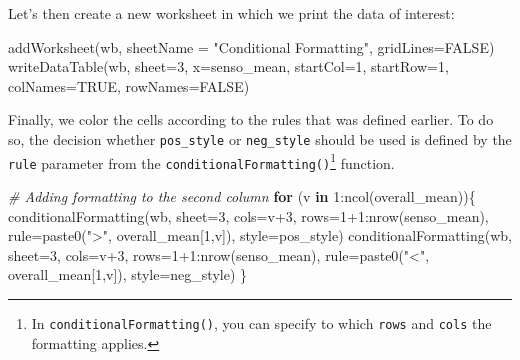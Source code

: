 \documentclass[
]{krantz}
\makeatletter
\newenvironment{Shaded}{\begin{snugshade}}{\end{snugshade}}
\newcommand{\AttributeTok}[1]{\textcolor[rgb]{0.61,0.61,0.61}{#1}}
\newcommand{\CommentTok}[1]{\textcolor[rgb]{0.37,0.37,0.37}{\textit{#1}}}
\newcommand{\ConstantTok}[1]{\textcolor[rgb]{0,0,0}{#1}}
\newcommand{\ControlFlowTok}[1]{\textcolor[rgb]{0.27,0.27,0.27}{\textbf{#1}}}
\newcommand{\DecValTok}[1]{\textcolor[rgb]{0.06,0.06,0.06}{#1}}
\newcommand{\FunctionTok}[1]{\textcolor[rgb]{0,0,0}{#1}}
\newcommand{\NormalTok}[1]{#1}
\newcommand{\SpecialCharTok}[1]{\textcolor[rgb]{0,0,0}{#1}}
\newcommand{\StringTok}[1]{\textcolor[rgb]{0.5,0.5,0.5}{#1}}
\newenvironment{kframe}{%
\medskip{}
\setlength{\fboxsep}{.8em}
 \def\at@end@of@kframe{}%
 \ifinner\ifhmode%
  \def\at@end@of@kframe{\end{minipage}}%
  \begin{minipage}{\columnwidth}%
 \fi\fi%
 \def\FrameCommand##1{\hskip\@totalleftmargin \hskip-\fboxsep
 \colorbox{shadecolor}{##1}\hskip-\fboxsep
     \hskip-\linewidth \hskip-\@totalleftmargin \hskip\columnwidth}%
 \MakeFramed {\advance\hsize-\width
   \@totalleftmargin\z@ \linewidth\hsize
   \@setminipage}}%
 {\par\unskip\endMakeFramed%
 \at@end@of@kframe}
\renewenvironment{Shaded}{\begin{kframe}}{\end{kframe}}
\makeatother
\begin{document}
Let's then create a new worksheet in which we print the data of interest:

\begin{Shaded}
\begin{Highlighting}[]
\FunctionTok{addWorksheet}\NormalTok{(wb, }\AttributeTok{sheetName =} \StringTok{"Conditional Formatting"}\NormalTok{, }\AttributeTok{gridLines=}\ConstantTok{FALSE}\NormalTok{)}
\FunctionTok{writeDataTable}\NormalTok{(wb, }\AttributeTok{sheet=}\DecValTok{3}\NormalTok{, }\AttributeTok{x=}\NormalTok{senso\_mean, }\AttributeTok{startCol=}\DecValTok{1}\NormalTok{, }\AttributeTok{startRow=}\DecValTok{1}\NormalTok{, }\AttributeTok{colNames=}\ConstantTok{TRUE}\NormalTok{, }\AttributeTok{rowNames=}\ConstantTok{FALSE}\NormalTok{)}
\end{Highlighting}
\end{Shaded}

Finally, we color the cells according to the rules that was defined earlier. To do so, the decision whether \texttt{pos\_style} or \texttt{neg\_style} should be used is defined by the \texttt{rule} parameter from the \texttt{conditionalFormatting()}\footnote{In \texttt{conditionalFormatting()}, you can specify to which \texttt{rows} and \texttt{cols} the formatting applies.} function.

\begin{Shaded}
\begin{Highlighting}[]
\CommentTok{\# Adding formatting to the second column}
\ControlFlowTok{for}\NormalTok{ (v }\ControlFlowTok{in} \DecValTok{1}\SpecialCharTok{:}\FunctionTok{ncol}\NormalTok{(overall\_mean))\{}
  \FunctionTok{conditionalFormatting}\NormalTok{(wb, }\AttributeTok{sheet=}\DecValTok{3}\NormalTok{, }\AttributeTok{cols=}\NormalTok{v}\SpecialCharTok{+}\DecValTok{3}\NormalTok{, }\AttributeTok{rows=}\DecValTok{1}\SpecialCharTok{+}\DecValTok{1}\SpecialCharTok{:}\FunctionTok{nrow}\NormalTok{(senso\_mean), }\AttributeTok{rule=}\FunctionTok{paste0}\NormalTok{(}\StringTok{"\textgreater{}"}\NormalTok{, overall\_mean[}\DecValTok{1}\NormalTok{,v]), }\AttributeTok{style=}\NormalTok{pos\_style)}
  \FunctionTok{conditionalFormatting}\NormalTok{(wb, }\AttributeTok{sheet=}\DecValTok{3}\NormalTok{, }\AttributeTok{cols=}\NormalTok{v}\SpecialCharTok{+}\DecValTok{3}\NormalTok{, }\AttributeTok{rows=}\DecValTok{1}\SpecialCharTok{+}\DecValTok{1}\SpecialCharTok{:}\FunctionTok{nrow}\NormalTok{(senso\_mean), }\AttributeTok{rule=}\FunctionTok{paste0}\NormalTok{(}\StringTok{"\textless{}"}\NormalTok{, overall\_mean[}\DecValTok{1}\NormalTok{,v]), }\AttributeTok{style=}\NormalTok{neg\_style)}
\NormalTok{\}}
\end{Highlighting}
\end{Shaded}
\end{document}
